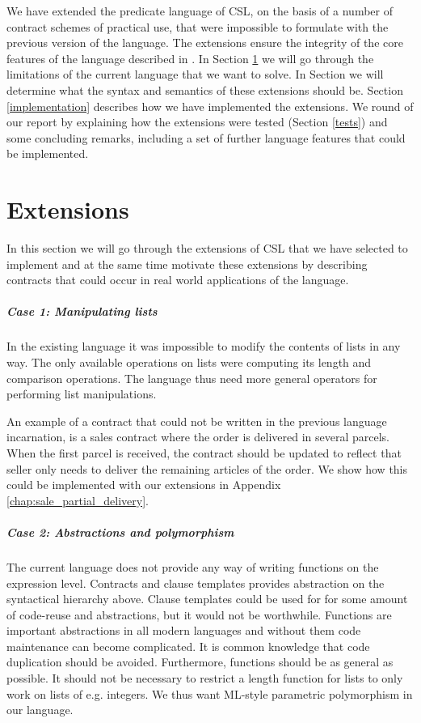 \documentclass[10pt,a4paper,final,oneside,openany,article]{memoir}
\begin{document}
We have extended the predicate language of CSL, on the basis of a
number of contract schemes of practical use, that were impossible to
formulate with the previous version of the language. The extensions
ensure the integrity of the core features of the language described in
\cite{hvitved10}.  In Section \ref{extensions} we will go through the
limitations of the current language that we want to solve. In Section
we will determine what the syntax and semantics of these extensions
should be.  Section \ref{implementation} describes how we have
implemented the extensions. We round of our report by explaining how
the extensions were tested (Section \ref{tests}) and some concluding
remarks, including a set of further language features that could be
implemented.

\chapter{Extensions}
\label{extensions}
In this section we will go through the extensions of CSL that we have
selected to implement and at the same time motivate these extensions
by describing contracts that could occur in real world applications of
the language.

\paragraph{Case 1: Manipulating lists} In the existing language it was
impossible to modify the contents of lists in any way. The only
available operations on lists were computing its length and comparison
operations. The language thus need more general operators for
performing list manipulations.

An example of a contract that could not be written in the previous
language incarnation, is a sales contract where the order is delivered
in several parcels. When the first parcel is received, the contract
should be updated to reflect that seller only needs to deliver the
remaining articles of the order.  We show how this could be
implemented with our extensions in Appendix
\ref{chap:sale_partial_delivery}.

\paragraph{Case 2: Abstractions and polymorphism} The current language
does not provide any way of writing functions on the expression
level. Contracts and clause templates provides abstraction on the
syntactical hierarchy above. Clause templates could be used for for
some amount of code-reuse and abstractions, but it would not be
worthwhile. Functions are important abstractions in all modern
languages and without them code maintenance can become complicated. It
is common knowledge that code duplication should be avoided.
Furthermore, functions should be as general as possible. It should not
be necessary to restrict a length function for lists to only work on
lists of e.g. integers. We thus want ML-style parametric polymorphism
in our language.
\end{document}
